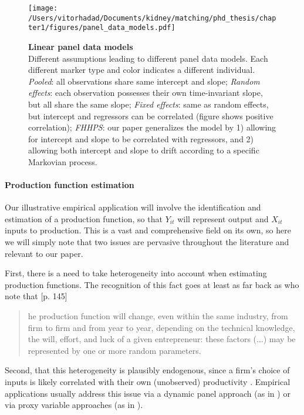 \begin{figure}
  \texttt{[image: /Users/vitorhadad/Documents/kidney/matching/phd\_thesis/chapter1/figures/panel\_data\_models.pdf]}
  \caption[Linear panel data models]{\textbf{Linear panel data models} \\ Different assumptions leading to different panel data models. Each different marker type and color indicates a different individual. \emph{Pooled}: all observations share same intercept and slope; \emph{Random effects}: each observation possesses their own time-invariant slope, but all share the same slope; \emph{Fixed effects}: same as random effects, but intercept and regressors can be correlated (figure shows positive correlation); \emph{FHHPS}: our paper generalizes the model by 1) allowing for intercept and slope to be correlated with regressors, and 2) allowing both intercept and slope to drift according to a specific Markovian process.}
  \label{fig:panel_data_models}
\end{figure}


\paragraph{Production function estimation} Our illustrative empirical application will involve the identification and estimation of a production function, so that $Y_{it}$ will represent output and $X_{it}$ inputs to production. This is a vast and comprehensive field on its own, so here we will simply note that two issues are pervasive throughout the literature and relevant to our paper.

First, there is a need to take heterogeneity into account when estimating production functions. The recognition of this fact goes at least as far back as \cite{marschak1944random} who note that [p. 145]
\begin{quote} 
\singlespacing
[T]he production function will change, even within the same industry, from firm to firm and from year to year, depending on the technical knowledge, the will, effort, and luck of a given entrepreneur: these factors (...) may be represented by one or more random parameters.
\end{quote}

Second, that this heterogeneity is plausibly endogenous, since a firm's choice of inputs is likely correlated with their own (unobserved) productivity \citep{gandhi2011identification}. Empirical applications usually address this issue via a dynamic panel approach (as in \cite{arellano1991some}) or via proxy variable approaches (as in \cite{levinsohn2003estimating}). 

